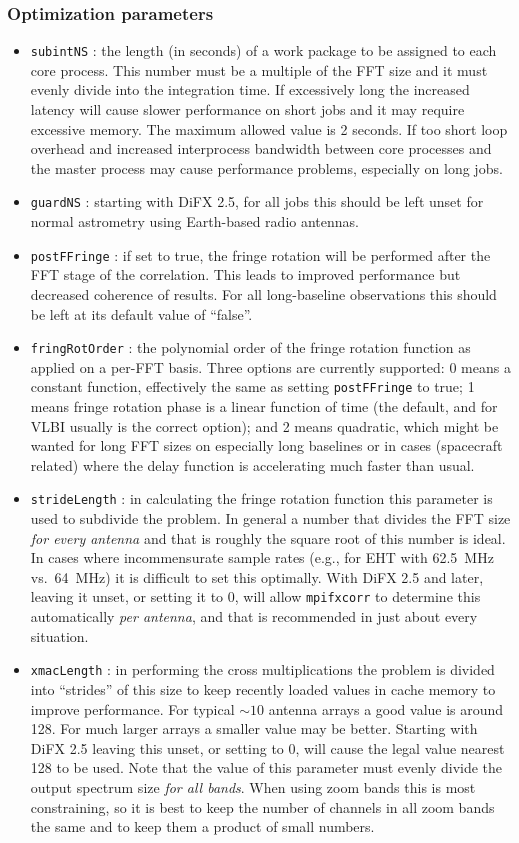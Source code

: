 \documentclass[12pt]{article}
\begin{document}
\subsubsection{Optimization parameters}

\begin{itemize}
\item {\tt subintNS} : the length (in seconds) of a work package to be assigned to each core process.
This number must be a multiple of the FFT size and it must evenly divide into the integration time.
If excessively long the increased latency will cause slower performance on short jobs and it may require excessive memory.  The maximum allowed value is 2 seconds.  If too short loop overhead and increased interprocess bandwidth between core processes and the master process may cause performance problems, especially on long jobs.
\item {\tt guardNS} : starting with DiFX 2.5, for all jobs this should be left unset for normal astrometry using Earth-based radio antennas.
\item {\tt postFFringe} : if set to true, the fringe rotation will be performed after the FFT stage of the correlation.
This leads to improved performance but decreased coherence of results. 
For all long-baseline observations this should be left at its default value of ``false''.
\item {\tt fringRotOrder} : the polynomial order of the fringe rotation function as applied on a per-FFT basis.
Three options are currently supported: 0 means a constant function, effectively the same as setting {\tt postFFringe} to true; 1 means fringe rotation phase is a linear function of time (the default, and for VLBI usually is the correct option); and 2 means quadratic, which might be wanted for long FFT sizes on especially long baselines or in cases (spacecraft related) where the delay function is accelerating much faster than usual.
\item {\tt strideLength} : in calculating the fringe rotation function this parameter is used to subdivide the problem.
In general a number that divides the FFT size {\em for every antenna} and that is roughly the square root of this number is ideal.
In cases where incommensurate sample rates (e.g., for EHT with 62.5~MHz vs.\ 64~MHz) it is difficult to set this optimally.
With DiFX 2.5 and later, leaving it unset, or setting it to 0, will allow {\tt mpifxcorr} to determine this automatically {\em per antenna}, and that is recommended in just about every situation.
\item {\tt xmacLength} : in performing the cross multiplications the problem is divided into ``strides'' of this size to keep recently loaded values in cache memory to improve performance.
For typical $\sim 10$ antenna arrays a good value is around 128.
For much larger arrays a smaller value may be better.
Starting with DiFX 2.5 leaving this unset, or setting to 0, will cause the legal value nearest 128 to be used.
Note that the value of this parameter must evenly divide the output spectrum size {\em for all bands}.
When using zoom bands this is most constraining, so it is best to keep the number of channels in all zoom bands the same and to keep them a product of small numbers.


\end{itemize}
\end{document}
